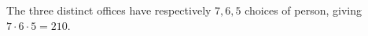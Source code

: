 The three distinct offices have respectively $7,6,5$ choices of person, giving $7\cdot6\cdot5=\boxed{210}$.
